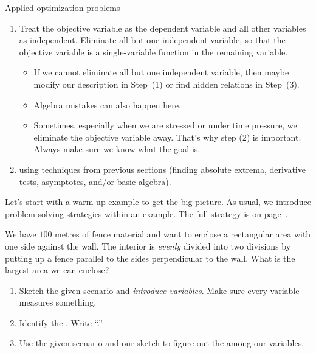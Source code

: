 \documentclass[../main.tex]{subfiles}
\begin{document}
\begin{lesson}{Applied optimization problems}
\begin{enumerate}[label=(\arabic*)]
    \item Treat the objective variable as the dependent variable and all other variables as independent. Eliminate all but one independent variable, so that the objective variable is a single-variable function in the remaining variable.

      \begin{itemize}
        \item If we cannot eliminate all but one independent variable, then maybe modify our description in Step~(1) or find hidden relations in Step~(3).
        \item Algebra mistakes can also happen here.
        \item Sometimes, especially when we are stressed or under time pressure, we eliminate the objective variable away. That's why step (2) is important. Always make sure we know what the goal is.
      \end{itemize}

    \item {} using techniques from previous sections (finding absolute extrema, derivative tests, asymptotes, and/or basic algebra).

  \end{enumerate}
  \clearpage

  Let's start with a warm-up example to get the big picture. As usual, we introduce problem-solving strategies within an example. The full strategy is on page~\pageref{page:optimization-strategy}.
  \begin{example} \label{ex:optimization-fence}
    We have \(100\) metres of fence material and want to enclose a rectangular area with one side against the wall. The interior is \emph{evenly} divided into two divisions by putting up a fence parallel to the sides perpendicular to the wall. What is the largest area we can enclose?

    \begin{enumerate}
      \item Sketch the given scenario and \emph{introduce variables}. Make sure every variable measures something.

      \item Identify the . Write ``\emph{}.''

      \item Use the given scenario and our sketch to figure out the  among our variables. 


\end{enumerate}
\end{example}
\end{lesson}
\end{document}
